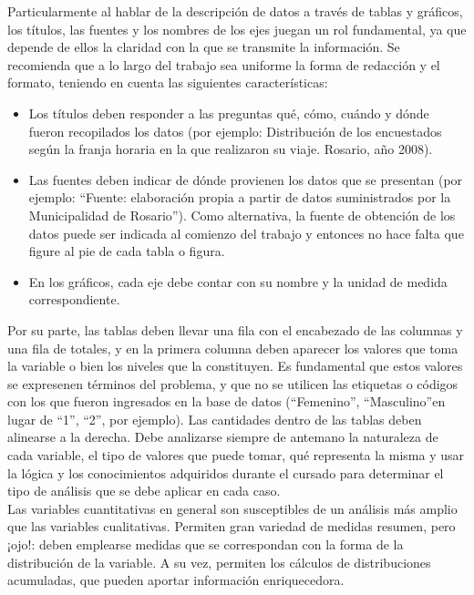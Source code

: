 \documentclass{../prob}
\begin{document}
Particularmente  al  hablar  de  la  descripción  de  datos  a  través  de  tablas  y  gráficos, los títulos, las fuentes y los nombres de los ejes juegan un rol fundamental, ya que depende de ellos la claridad con la que se transmite la información. Se recomienda que a lo largo del trabajo sea uniforme la forma de redacción y el formato, teniendo en cuenta las siguientes características:
\begin{itemize}
\item Los títulos deben responder a las preguntas qué, cómo, cuándo y dónde fueron recopilados  los  datos  (por  ejemplo:  Distribución  de  los  encuestados  según  la franja horaria en la que realizaron su viaje. Rosario, año 2008). 
\item Las fuentes deben  indicar  de dónde  provienen los  datos que se presentan (por ejemplo:  \textquotedblleft Fuente:  elaboración  propia  a  partir  de  datos  suministrados  por  la Municipalidad  de  Rosario\textquotedblright ).  Como  alternativa, la  fuente  de  obtención  de  los datos puede ser indicada al comienzo del trabajo  y entonces no hace falta que figure al pie de cada tabla o figura. 
\item En  los  gráficos,  cada eje debe  contar  con  su  nombre  y  la  unidad  de  medida correspondiente.
\end{itemize}

Por su  parte, las tablas deben llevar  una fila con el  encabezado de  las  columnas y una fila de totales, y en la primera columna deben aparecer los valores que toma la variable o bien los  niveles  que la  constituyen.  Es  fundamental que  estos  valores  se  expresenen  términos  del problema, y que no se utilicen las etiquetas o códigos con los que fueron ingresados en la base de datos (\textquotedblleft Femenino\textquotedblright , \textquotedblleft Masculino\textquotedblright en lugar de \textquotedblleft 1\textquotedblright , \textquotedblleft 2\textquotedblright , por ejemplo). Las cantidades dentro de las tablas deben alinearse a la derecha. Debe analizarse siempre de antemano la naturaleza de cada  variable,  el  tipo  de  valores  que puede  tomar, qué  representa  la  misma y usar  la  lógica  y los  conocimientos  adquiridos  durante  el  cursado  para  determinar  el  tipo  de  análisis  que  se debe aplicar en cada caso.\\

Las  variables  cuantitativas  en  general  son  susceptibles  de un  análisis  más amplio que las  variables  cualitativas.  Permiten  gran  variedad  de  medidas  resumen,  pero  ¡ojo!:  deben emplearse  medidas  que  se  correspondan  con  la  forma  de  la  distribución  de  la  variable.  A  su vez,  permiten  los  cálculos  de  distribuciones  acumuladas,  que  pueden  aportar  información enriquecedora.\\
\end{document}
